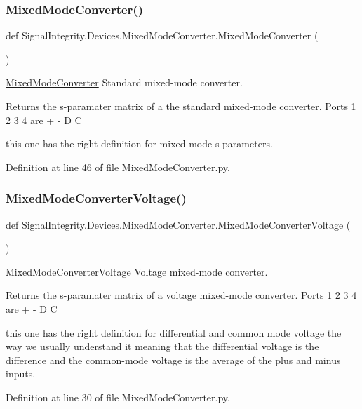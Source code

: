 \subsubsection{\texorpdfstring{Mixed\+Mode\+Converter()}{MixedModeConverter()}}
{\footnotesize\ttfamily def Signal\+Integrity.\+Devices.\+Mixed\+Mode\+Converter.\+Mixed\+Mode\+Converter (\begin{DoxyParamCaption}{ }\end{DoxyParamCaption})}



\hyperlink{namespaceSignalIntegrity_1_1Devices_1_1MixedModeConverter}{Mixed\+Mode\+Converter} Standard mixed-\/mode converter. 

\begin{DoxyReturn}{Returns}
the s-\/paramater matrix of a the standard mixed-\/mode converter. Ports 1 2 3 4 are + -\/ D C
\end{DoxyReturn}
this one has the right definition for mixed-\/mode s-\/parameters. 

Definition at line 46 of file Mixed\+Mode\+Converter.\+py.

\mbox{\label{namespaceSignalIntegrity_1_1Devices_1_1MixedModeConverter_a373cd4a14b6f9ea44be46f2ded959e64}} 
\subsubsection{\texorpdfstring{Mixed\+Mode\+Converter\+Voltage()}{MixedModeConverterVoltage()}}
{\footnotesize\ttfamily def Signal\+Integrity.\+Devices.\+Mixed\+Mode\+Converter.\+Mixed\+Mode\+Converter\+Voltage (\begin{DoxyParamCaption}{ }\end{DoxyParamCaption})}



Mixed\+Mode\+Converter\+Voltage Voltage mixed-\/mode converter. 

\begin{DoxyReturn}{Returns}
the s-\/paramater matrix of a voltage mixed-\/mode converter. Ports 1 2 3 4 are + -\/ D C
\end{DoxyReturn}
this one has the right definition for differential and common mode voltage the way we usually understand it meaning that the differential voltage is the difference and the common-\/mode voltage is the average of the plus and minus inputs. 

Definition at line 30 of file Mixed\+Mode\+Converter.\+py.

